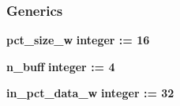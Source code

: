 \subsubsection*{Generics}
 \begin{DoxyCompactItemize}
\item 
{\bf pct\+\_\+size\+\_\+w} {\bfseries {\bfseries \textcolor{comment}{integer}\textcolor{vhdlchar}{ }\textcolor{vhdlchar}{ }\textcolor{vhdlchar}{\+:}\textcolor{vhdlchar}{=}\textcolor{vhdlchar}{ }\textcolor{vhdlchar}{ } \textcolor{vhdldigit}{16} \textcolor{vhdlchar}{ }}}
\item 
{\bf n\+\_\+buff} {\bfseries {\bfseries \textcolor{comment}{integer}\textcolor{vhdlchar}{ }\textcolor{vhdlchar}{ }\textcolor{vhdlchar}{\+:}\textcolor{vhdlchar}{=}\textcolor{vhdlchar}{ }\textcolor{vhdlchar}{ } \textcolor{vhdldigit}{4} \textcolor{vhdlchar}{ }}}
\item 
{\bf in\+\_\+pct\+\_\+data\+\_\+w} {\bfseries {\bfseries \textcolor{comment}{integer}\textcolor{vhdlchar}{ }\textcolor{vhdlchar}{ }\textcolor{vhdlchar}{\+:}\textcolor{vhdlchar}{=}\textcolor{vhdlchar}{ }\textcolor{vhdlchar}{ } \textcolor{vhdldigit}{32} \textcolor{vhdlchar}{ }}}
\end{DoxyCompactItemize}
